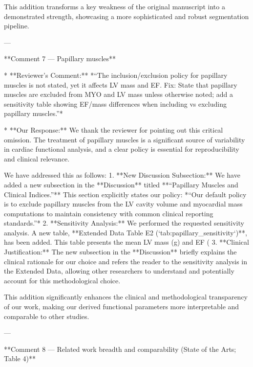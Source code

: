     This addition transforms a key weakness of the original manuscript into a demonstrated strength, showcasing a more sophisticated and robust segmentation pipeline.

---

**Comment 7 — Papillary muscles**

*   **Reviewer’s Comment:** *“The inclusion/exclusion policy for papillary muscles is not stated, yet it affects LV mass and EF. Fix: State that papillary muscles are excluded from MYO and LV mass unless otherwise noted; add a sensitivity table showing EF/mass differences when including vs excluding papillary muscles.”*

*   **Our Response:** We thank the reviewer for pointing out this critical omission. The treatment of papillary muscles is a significant source of variability in cardiac functional analysis, and a clear policy is essential for reproducibility and clinical relevance.

    We have addressed this as follows:
    1.  **New Discussion Subsection:** We have added a new subsection in the **Discussion** titled **“Papillary Muscles and Clinical Indices.”** This section explicitly states our policy: *“Our default policy is to exclude papillary muscles from the LV cavity volume and myocardial mass computations to maintain consistency with common clinical reporting standards.”*
    2.  **Sensitivity Analysis:** We performed the requested sensitivity analysis. A new table, **Extended Data Table E2 (`tab:papillary_sensitivity`)**, has been added. This table presents the mean LV mass (g) and EF (%
    3.  **Clinical Justification:** The new subsection in the **Discussion** briefly explains the clinical rationale for our choice and refers the reader to the sensitivity analysis in the Extended Data, allowing other researchers to understand and potentially account for this methodological choice.

    This addition significantly enhances the clinical and methodological transparency of our work, making our derived functional parameters more interpretable and comparable to other studies.

---

**Comment 8 — Related work breadth and comparability (State of the Arts; Table 4)**

